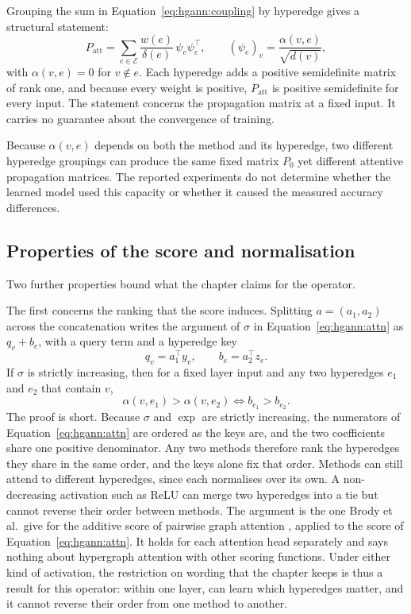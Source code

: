 Grouping the sum in Equation~\ref{eq:hgann:coupling} by hyperedge gives a structural statement:
\begin{equation}
  P_{\text{att}} = \sum_{e \in \mathcal{E}} \frac{w(e)}{\delta(e)}\, \psi_e \psi_e^{\top} ,
  \qquad
  (\psi_e)_v = \frac{\alpha(v,e)}{\sqrt{d(v)}} ,
  \label{eq:hgann:rankone}
\end{equation}
with $\alpha(v,e) = 0$ for $v \notin e$. Each hyperedge adds a positive semidefinite matrix of rank
one, and because every weight is positive, $P_{\text{att}}$ is positive semidefinite for every
input. The statement concerns the propagation matrix at a fixed input. It carries no guarantee about
the convergence of training.

Because $\alpha(v,e)$ depends on both the method and its hyperedge, two different hyperedge
groupings can produce the same fixed matrix $P_0$ yet different attentive propagation matrices.
The reported experiments do not determine whether the learned model used this capacity or whether
it caused the measured accuracy differences.

\subsection*{Properties of the score and normalisation}

Two further properties bound what the chapter claims for the operator.

The first concerns the ranking that the score induces. Splitting $a = (a_1, a_2)$ across the
concatenation writes the argument of $\sigma$ in Equation~\ref{eq:hgann:attn} as $q_v + b_e$, with
a query term and a hyperedge key
\begin{equation}
  q_v = a_1^{\top} y_v , \qquad b_e = a_2^{\top} z_e .
  \label{eq:hgann:split}
\end{equation}
If $\sigma$ is strictly increasing, then for a fixed layer input and any two hyperedges $e_1$ and
$e_2$ that contain $v$,
\begin{equation}
  \alpha(v, e_1) > \alpha(v, e_2) \iff b_{e_1} > b_{e_2} .
  \label{eq:hgann:ranking}
\end{equation}
The proof is short. Because $\sigma$ and $\exp$ are strictly increasing, the numerators of
Equation~\ref{eq:hgann:attn} are ordered as the keys are, and the two coefficients share one
positive denominator. Any two methods therefore rank the hyperedges they share in the same order,
and the keys alone fix that order. Methods can still attend to different hyperedges, since each
normalises over its own. A non-decreasing activation such as ReLU can merge two hyperedges into a
tie but cannot reverse their order between methods. The argument is the one Brody et al.\ give for
the additive score of pairwise graph attention \cite{brody2022gatv2}, applied to the score of
Equation~\ref{eq:hgann:attn}. It holds for each attention head separately and says nothing about
hypergraph attention with other scoring functions. Under either kind of activation, the restriction
on wording that the chapter keeps is thus a result for this operator: within one layer, \hgann{}
can learn which hyperedges matter, and it cannot reverse their order from one method to another.

